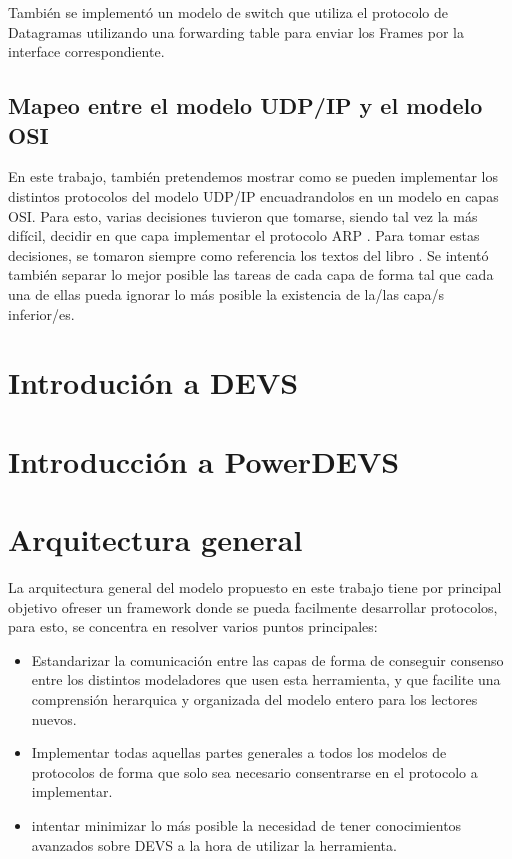 \documentclass[10pt,a4paper]{article}
\begin{document}
También se implementó un modelo de switch que utiliza el protocolo de Datagramas \cite{petersonSwitchDatagram} utilizando una forwarding table para enviar los Frames por la interface correspondiente. 

\subsection{Mapeo entre el modelo UDP/IP y el modelo OSI}

En este trabajo, también pretendemos mostrar como se pueden implementar los distintos protocolos del modelo UDP/IP encuadrandolos en un modelo en capas OSI. Para esto, varias decisiones tuvieron que tomarse, siendo tal vez la más difícil, decidir en que capa implementar el protocolo ARP \cite[p.~228]{peterson2007computer}. Para tomar estas decisiones, se tomaron siempre como referencia los textos del libro \cite{peterson2007computer}. Se intentó también separar lo mejor posible las tareas de cada capa de forma tal que cada una de ellas pueda ignorar lo más posible la existencia de la/las capa/s inferior/es.

\section{Introdución a DEVS}
\section{Introducción a PowerDEVS}
\section{Arquitectura general}

La arquitectura general del modelo propuesto en este trabajo tiene por principal objetivo ofreser un framework donde se pueda facilmente desarrollar protocolos, para esto, se concentra en resolver varios puntos principales:

\begin{itemize}
\item Estandarizar la comunicación entre las capas de forma de conseguir consenso entre los distintos modeladores que usen esta herramienta, y que facilite una comprensión herarquica y organizada del modelo entero para los lectores nuevos.
\item Implementar todas aquellas partes generales a todos los modelos de protocolos de forma que solo sea necesario consentrarse en el protocolo a implementar.
\item intentar minimizar lo más posible la necesidad de tener conocimientos avanzados sobre DEVS a la hora de utilizar la herramienta.
\end{itemize}
\end{document}
